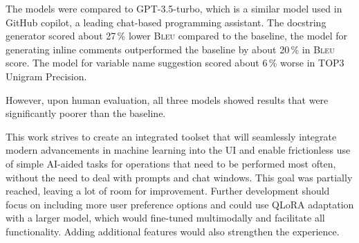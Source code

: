     The models were compared to GPT-3.5-turbo, which is a similar model used in GitHub copilot, a leading chat-based programming assistant. The docstring generator scored about 27\,\% lower \textsc{Bleu} compared to the baseline, the model for generating inline comments outperformed the baseline by about 20\,\% in \textsc{Bleu} score. The model for variable name suggestion scored about 6\,\% worse in TOP3 Unigram Precision.

    However, upon human evaluation, all three models showed results that were significantly poorer than the baseline.
    
    This work strives to create an integrated toolset that will seamlessly integrate modern advancements in machine learning into the UI and enable frictionless use of simple AI-aided tasks for operations that need to be performed most often, without the need to deal with prompts and chat windows. This goal was partially reached, leaving a lot of room for improvement. Further development should focus on including more user preference options and could use QLoRA adaptation with a larger model, which would fine-tuned multimodally and facilitate all functionality. Adding additional features would also strengthen the experience.
